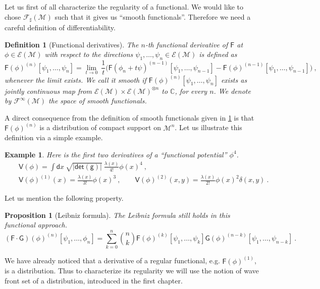 \documentclass[11pt]{book}
\newcommand{\abs}[1]{\left|#1\right|}
\renewcommand{\det}{\mathsf{det}}
\newcommand{\Ecal}{\mathcal{E}}
\newcommand{\Fcal}{\mathcal{F}}
\newcommand{\Mcal}{\mathcal{M}}
\newcommand{\Cbb}{\mathbb{C}}
\newcommand{\Fsf}{\mathsf{F}}
\newcommand{\Gsf}{\mathsf{G}}
\newcommand{\Vsf}{\mathsf{V}}
\newcommand{\dsf}{\mathsf{d}}
\newcommand{\gsf}{\mathsf{g}}
\theoremstyle{break}
\newtheorem{proposition}{Proposition}
\newtheorem{example}{Example}
\newtheorem{definition}{Definition}
\begin{document}
\bigskip

Let us first of all characterize the regularity of a functional. We would like to chose $\Fcal_\sharp(\Mcal)$ such that it gives us ``smooth functionals''. Therefore we need a careful definition of differentiability.%
%
\begin{definition}[Functional derivatives] \label{def:func-deriv}
The $n$-th functional derivative of $\Fsf$ at $\phi\in\Ecal(\Mcal)$ with respect to the directions $\psi_1, \dots, \psi_n \in\Ecal(\Mcal)$ is defined as%
%
\begin{equation*}%
\Fsf(\phi)^{(n)}[\psi_1,\dots ,\psi_n] = \lim_{t \to 0} \ \frac{1}{t} \bigg( \Fsf(\phi_n + t \psi)^{(n-1)}[\psi_1,\dots ,\psi_{n-1}] - \Fsf(\phi)^{(n-1)}[\psi_1,\dots ,\psi_{n-1}] \bigg) \ ,
\end{equation*}
%
whenever the limit exists. We call it smooth if $\Fsf(\phi)^{(n)}[\psi_1,\dots ,\psi_n]$ exists as jointly continuous map from $\Ecal(\Mcal) \times \Ecal(\Mcal)^{\otimes n}$ to $\Cbb$, for every $n$. We denote by $\Fcal^\infty(\Mcal)$ the space of smooth functionals.


\end{definition}
%
A direct consequence from the definition of smooth functionals given in \ref{def:func-deriv} is that $\Fsf(\phi)^{(n)}$ is a distribution of compact support on $\Mcal^n$.  Let us illustrate this definition via a simple example.%
\begin{example}
%
Here is the first two derivatives of a ``functional potential'' $\phi^4$. 
%
\begin{eqnarray*}
&& \Vsf(\phi) = \int \dsf x \ \sqrt{\abs{\det(\gsf)}} \ \frac{\lambda(x)}{4!} \phi(x)^4 \ ,\\
%
&& \Vsf(\phi)^{(1)}(x) = \frac{\lambda(x)}{3!} \phi(x)^3 \ , \qquad
%
\Vsf(\phi)^{(2)}(x,y) = \frac{\lambda(x)}{2!} \phi(x)^2 \delta(x,y) \ .
\end{eqnarray*}
%
\end{example}
%
Let us mention the following property.
%
\begin{proposition}[Leibniz formula]
The Leibniz formula still holds in this functional approach.
%
\begin{equation*}
\left(\Fsf \cdot \Gsf\right)(\phi)^{(n)}[\psi_1, \dots ,\phi_n] = \sum_{k=0}^{n} \binom{n}{k} \Fsf(\phi)^{(k)}[\psi_1, \dots , \psi_k] \Gsf(\phi)^{(n-k)}[\psi_1, \dots , \psi_{n-k}] \ .
\end{equation*}
%
\end{proposition}
%
%
We have already noticed that a derivative of a regular functional, e.g. $\Fsf(\phi)^{(1)}$, is a distribution. Thus to characterize its regularity we will use the notion of wave front set of a distribution, introduced in the first chapter.%
\end{document}
